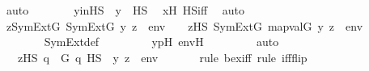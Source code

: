 \begin{isabellebody}
\ auto\isanewline
\ \ \ \ \isamarkupfalse%
\ \isamarkupfalse%
\ y{\isacharprime}{\kern0pt}inHS\ {\isacharcolon}{\kern0pt}\ {\isachardoublequoteopen}y{\isacharprime}{\kern0pt}\ {\isasymin}\ HS{\isachardoublequoteclose}\ \isamarkupfalse%
\ x{\isacharprime}{\kern0pt}H\ HS{\isacharunderscore}{\kern0pt}iff\ \isamarkupfalse%
\ auto\isanewline
\isanewline
\ \ \ \ \isamarkupfalse%
\ {\isachardoublequoteopen}{\isacharparenleft}{\kern0pt}{\isasymexists}z{\isasymin}SymExt{\isacharparenleft}{\kern0pt}G{\isacharparenright}{\kern0pt}{\isachardot}{\kern0pt}\ SymExt{\isacharparenleft}{\kern0pt}G{\isacharparenright}{\kern0pt}{\isacharcomma}{\kern0pt}\ {\isacharbrackleft}{\kern0pt}y{\isacharcomma}{\kern0pt}\ z{\isacharbrackright}{\kern0pt}\ {\isacharat}{\kern0pt}\ env\ {\isasymTurnstile}\ {\isasymphi}{\isacharparenright}{\kern0pt}\ {\isasymlongleftrightarrow}\ {\isacharparenleft}{\kern0pt}{\isasymexists}z{\isacharprime}{\kern0pt}{\isasymin}HS{\isachardot}{\kern0pt}\ SymExt{\isacharparenleft}{\kern0pt}G{\isacharparenright}{\kern0pt}{\isacharcomma}{\kern0pt}\ map{\isacharparenleft}{\kern0pt}val{\isacharparenleft}{\kern0pt}G{\isacharparenright}{\kern0pt}{\isacharcomma}{\kern0pt}\ {\isacharbrackleft}{\kern0pt}y{\isacharprime}{\kern0pt}{\isacharcomma}{\kern0pt}\ z{\isacharprime}{\kern0pt}{\isacharbrackright}{\kern0pt}\ {\isacharat}{\kern0pt}\ env{\isacharprime}{\kern0pt}{\isacharparenright}{\kern0pt}\ {\isasymTurnstile}\ {\isasymphi}{\isacharparenright}{\kern0pt}{\isachardoublequoteclose}\isanewline
\ \ \ \ \ \ \isamarkupfalse%
\ SymExt{\isacharunderscore}{\kern0pt}def\ \isanewline
\ \ \ \ \ \ \isamarkupfalse%
\ y{\isacharprime}{\kern0pt}pH\ env{\isacharprime}{\kern0pt}H\ \isanewline
\ \ \ \ \ \ \isamarkupfalse%
\ auto\isanewline
\ \ \ \ \isamarkupfalse%
\ \isamarkupfalse%
\ {\isachardoublequoteopen}{\isachardot}{\kern0pt}{\isachardot}{\kern0pt}{\isachardot}{\kern0pt}\ {\isasymlongleftrightarrow}\ {\isacharparenleft}{\kern0pt}{\isasymexists}z{\isacharprime}{\kern0pt}{\isasymin}HS{\isachardot}{\kern0pt}\ {\isasymexists}q\ {\isasymin}\ G{\isachardot}{\kern0pt}\ q\ {\isasymtturnstile}HS\ {\isasymphi}\ {\isacharbrackleft}{\kern0pt}y{\isacharprime}{\kern0pt}{\isacharcomma}{\kern0pt}\ z{\isacharprime}{\kern0pt}{\isacharbrackright}{\kern0pt}\ {\isacharat}{\kern0pt}\ env{\isacharprime}{\kern0pt}{\isacharparenright}{\kern0pt}{\isachardoublequoteclose}\isanewline
\ \ \ \ \ \ \isamarkupfalse%
{\isacharparenleft}{\kern0pt}rule\ bex{\isacharunderscore}{\kern0pt}iff{\isacharcomma}{\kern0pt}\ rule\ iff{\isacharunderscore}{\kern0pt}flip{\isacharparenright}{\kern0pt}\isanewline

\end{isabellebody}
